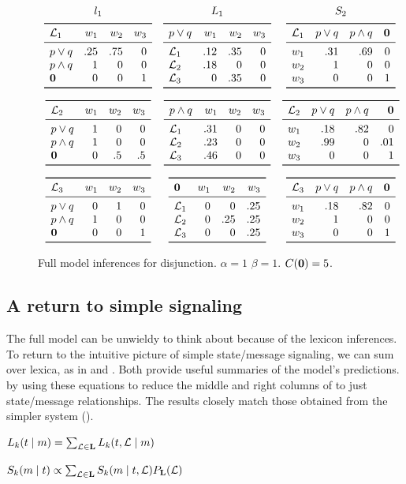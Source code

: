 \documentclass{article}
\begin{document}
\begin{figure}[tp]
  \centering
  $\begin{array}{c c c}
     \listenerOne & \ListenerK[1] & \SpeakerK[2] 
     \\[1ex]     
     \listenerMatrix%
     {\Lex_{1}}%
     {.25 & .75 & 0}%
     {1 & 0 & 0}%
     {0 & 0 & 1}     
     &
     \ListenerKMatrix%
     {\porq}%
     {.12 & .35 & 0}%
     {.18 & 0 & 0}
     {0 & .35 & 0}            
     &
     \SpeakerKMatrix%
     {1}%
     {.31 & .69 & 0}%
     {1 & 0 & 0}%
     {0 & 0 & 1}
     \\[8ex]
     \listenerMatrix%
     {\Lex_{2}}%
     {1 & 0 & 0}%
     {1 & 0 & 0}%
     {0 & .5 & .5}%
     &
     \ListenerKMatrix%
     {\pandq}%
     {.31 & 0 & 0}
     {.23 & 0 & 0}
     {.46 & 0 & 0}
     &
     \SpeakerKMatrix%
     {2}%
     {.18 & .82 & 0}%
     {.99 & 0 & .01}%
     {0 & 0 & 1}%
     \\[8ex]
     \listenerMatrix%
     {\Lex_{3}}%
     {0 & 1 & 0}%
     {1 & 0 & 0}%
     {0 & 0 & 1}%
     &
     \ListenerKMatrix%
     {\nullmsg}%
     {0 & 0 & .25}%
     {0 & .25 & .25}%
     {0 & 0 & .25}%
     &
     \SpeakerKMatrix%
     {3}%
     {.18 & .82 & 0}%
     {1 & 0 & 0}%
     {0 & 0 & 1}%
   \end{array}$
   \caption{Full model inferences for disjunction. $\alpha = 1$
   $\beta = 1$. $C(\mathbf{0}) = 5$.}
  \label{fig:full-disj}
\end{figure}


\subsection{A return to simple signaling}\label{sec:return}

The full model can be unwieldy to think about because of the lexicon
inferences. To return to the intuitive picture of simple state/message
signaling, we can sum over lexica, as in  and
. Both provide useful summaries of the model's
predictions.  by using these equations to reduce
the middle and right columns of  to just 
state/message relationships. The results closely match those obtained
from the simpler system ().
%
\begin{examples}
\item\label{lisnorm}%
  $L_{k}(t \mid m)  = 
  \sum_{\mathcal{L} \in \mathbf{L}} L_{k}(t, \mathcal{L} \mid m)$
\item\label{spknorm}%
  $S_{k}(m \mid t) \propto 
  \sum_{\mathcal{L} \in \mathbf{L}} S_{k}(m \mid t, \mathcal{L})
  P_{\mathbf{L}}(\mathcal{L})$
\end{examples}
\end{document}
